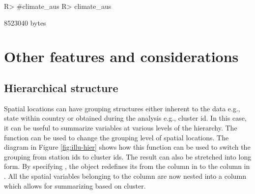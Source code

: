 \documentclass[
  shortnames]{jss}
\begin{document}
\begin{CodeChunk}
\begin{CodeInput}
R> #climate_aus %
R> climate_aus %
\end{CodeInput}
\begin{CodeOutput}
8523040 bytes
\end{CodeOutput}
\end{CodeChunk}

\hypertarget{others}{%
\section{Other features and considerations}\label{others}}

\hypertarget{hierarchical-structure}{%
\subsection{Hierarchical structure}\label{hierarchical-structure}}

Spatial locations can have grouping structures either inherent to the data e.g., state within country or obtained during the analysis e.g., cluster id. In this case, it can be useful to summarize variables at various levels of the hierarchy. The function  can be used to change the grouping level of spatial locations. The diagram in Figure \ref{fig:illu-hier} shows how this function can be used to switch the grouping from station ids to cluster ids. The result can also be stretched into long form. By specifying , the  object redefines its  from the  column in  to the  column in . All the spatial variables belonging to the  column are now nested into a  column which allows for summarizing based on cluster.
\end{document}
